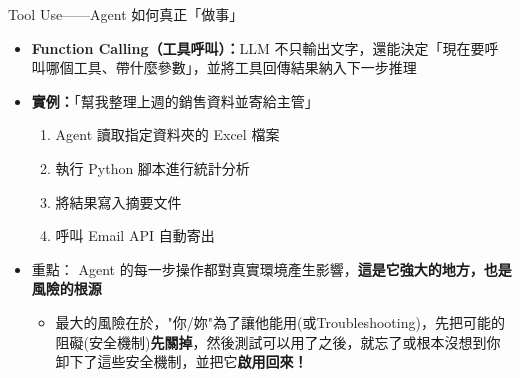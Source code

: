 \documentclass[aspectratio=1610]{Common/MyCourseBeamer}
\begin{document}
\begin{frame}[allowframebreaks=0.85]{Tool Use——Agent 如何真正「做事」}

	\begin{itemize}
		\item \textbf{Function Calling（工具呼叫）：}LLM 不只輸出文字，還能決定「現在要呼叫哪個工具、帶什麼參數」，並將工具回傳結果納入下一步推理
	\end{itemize}

	\vspace{0.3em}
	

	\framebreak
	\begin{itemize}
		\item \textbf{實例：}「幫我整理上週的銷售資料並寄給主管」
			\begin{enumerate}
				\item Agent 讀取指定資料夾的 Excel 檔案
				\item 執行 Python 腳本進行統計分析
				\item 將結果寫入摘要文件
				\item 呼叫 Email API 自動寄出
			\end{enumerate}

		\item \alert{重點：} Agent 的每一步操作都對真實環境產生影響，\textbf{這是它強大的地方，也是風險的根源}
            \begin{itemize}
                \item 最大的風險在於，"你/妳"為了讓他能用(或Troubleshooting)，先把可能的阻礙(安全機制)\textbf{先關掉}，然後測試可以用了之後，就忘了或根本沒想到你卸下了這些安全機制，並把它\textbf{啟用回來！}
            \end{itemize}
	\end{itemize}

\end{frame}
\end{document}
